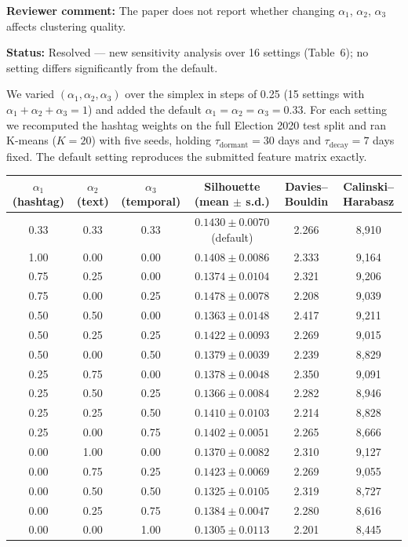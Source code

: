 \documentclass[11pt,a4paper]{article}
\newcommand{\status}[1]{\textbf{\color{statusgreen}Status:} #1}
\begin{document}
\begin{revcomment}
\textbf{Reviewer comment:} The paper does not report whether changing $\alpha_1$, $\alpha_2$, $\alpha_3$ affects clustering quality.
\end{revcomment}

\status{Resolved --- new sensitivity analysis over 16 settings (Table~6); no setting differs significantly from the default.}

We varied $(\alpha_1, \alpha_2, \alpha_3)$ over the simplex in steps of 0.25 (15 settings with $\alpha_1 + \alpha_2 + \alpha_3 = 1$) and added the default $\alpha_1 = \alpha_2 = \alpha_3 = 0.33$. For each setting we recomputed the hashtag weights on the full Election 2020 test split and ran K-means ($K = 20$) with five seeds, holding $\tau_{\text{dormant}} = 30$ days and $\tau_{\text{decay}} = 7$ days fixed. The default setting reproduces the submitted feature matrix exactly.

\begin{center}
\small
\begin{tabular}{cccccc}
\toprule
$\alpha_1$ (hashtag) & $\alpha_2$ (text) & $\alpha_3$ (temporal) & Silhouette (mean $\pm$ s.d.) & Davies--Bouldin & Calinski--Harabasz \\
\midrule
0.33 & 0.33 & 0.33 & $0.1430 \pm 0.0070$ (default) & 2.266 & 8,910 \\
1.00 & 0.00 & 0.00 & $0.1408 \pm 0.0086$ & 2.333 & 9,164 \\
0.75 & 0.25 & 0.00 & $0.1374 \pm 0.0104$ & 2.321 & 9,206 \\
0.75 & 0.00 & 0.25 & $0.1478 \pm 0.0078$ & 2.208 & 9,039 \\
0.50 & 0.50 & 0.00 & $0.1363 \pm 0.0148$ & 2.417 & 9,211 \\
0.50 & 0.25 & 0.25 & $0.1422 \pm 0.0093$ & 2.269 & 9,015 \\
0.50 & 0.00 & 0.50 & $0.1379 \pm 0.0039$ & 2.239 & 8,829 \\
0.25 & 0.75 & 0.00 & $0.1378 \pm 0.0048$ & 2.350 & 9,091 \\
0.25 & 0.50 & 0.25 & $0.1366 \pm 0.0084$ & 2.282 & 8,946 \\
0.25 & 0.25 & 0.50 & $0.1410 \pm 0.0103$ & 2.214 & 8,828 \\
0.25 & 0.00 & 0.75 & $0.1402 \pm 0.0051$ & 2.265 & 8,666 \\
0.00 & 1.00 & 0.00 & $0.1370 \pm 0.0082$ & 2.310 & 9,127 \\
0.00 & 0.75 & 0.25 & $0.1423 \pm 0.0069$ & 2.269 & 9,055 \\
0.00 & 0.50 & 0.50 & $0.1325 \pm 0.0105$ & 2.319 & 8,727 \\
0.00 & 0.25 & 0.75 & $0.1384 \pm 0.0047$ & 2.280 & 8,616 \\
0.00 & 0.00 & 1.00 & $0.1305 \pm 0.0113$ & 2.201 & 8,445 \\
\bottomrule
\end{tabular}
\end{center}
\end{document}
